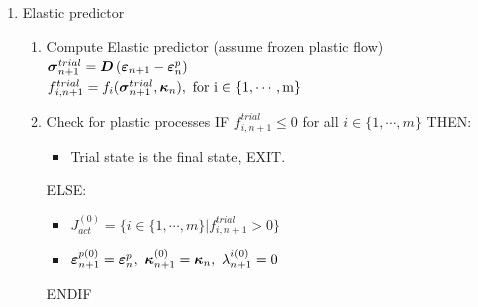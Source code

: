 \documentclass[a4paper]{article}
\newcommand{\mbf}[1]{\mbox{\boldmath$#1$}}
\newcommand{\ep}[0]{\mbf{\varepsilon}^p}
\newcommand{\e}{\mbf{\varepsilon}}
\newcommand{\sig}{\mbf{\sigma}}
\newcommand{\kap}{\mbf{\kappa}}
\begin{document}
\begin{table}
\label{closespointalgo}
{\small
\begin{enumerate}
\item
  Elastic predictor

  \begin{enumerate}
  \item
 Compute Elastic predictor (assume frozen plastic flow)\\
 $\sig^{trial}_{n+1} = \mbf{D}\left(\e_{n+1}-\ep_{n}\right)$\\
 $f^{trial}_{i,n+1}=f_i(\sig^{trial}_{n+1},\kap_{n}),\ \rm{for}\ i\in\{1,\cdots,m\}$
  \item
 Check for plastic processes
 IF $f^{trial}_{i,n+1}\le 0$ for all $i\in\{1,\cdots,m\}$ THEN:
 \begin{itemize}
\item[]
  Trial state is the final state, EXIT.
 \end{itemize}
 ELSE:
 \begin{itemize}
 \item[]
$J^{(0)}_{act}=\{i\in\{1,\cdots,m\}|f^{trial}_{i,n+1} > 0\}$
 \item[]
$\e^{p(0)}_{n+1}=\ep_n,\ \kap^{(0)}_{n+1}=\kap_n,\ \lambda^{i(0)}_{n+1}=0$
 \end{itemize}
 ENDIF
\end{enumerate}


\end{enumerate}}
\end{table}
\end{document}
